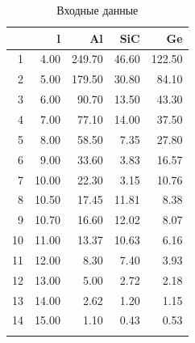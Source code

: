 \documentclass[a4paper,11pt]{report}\usepackage[]{graphicx}\usepackage[]{color}
\makeatletter
\newenvironment{kframe}{%
 \def\at@end@of@kframe{}%
 \ifinner\ifhmode%
  \def\at@end@of@kframe{\end{minipage}}%
  \begin{minipage}{\columnwidth}%
 \fi\fi%
 \def\FrameCommand##1{\hskip\@totalleftmargin \hskip-\fboxsep
 \colorbox{shadecolor}{##1}\hskip-\fboxsep
     \hskip-\linewidth \hskip-\@totalleftmargin \hskip\columnwidth}%
 \MakeFramed {\advance\hsize-\width
   \@totalleftmargin\z@ \linewidth\hsize
   \@setminipage}}%
 {\par\unskip\endMakeFramed%
 \at@end@of@kframe}
\makeatother
\begin{document}
\begin{kframe}


{\ttfamily\noindent\bfseries{}}\end{kframe}%
{\small
\begin{longtable}{|r|r|rrr|}
  \hline
 & l & Al & SiC & Ge \\ 
  \hline
1 & 4.00 & 249.70 & 46.60 & 122.50 \\ 
  2 & 5.00 & 179.50 & 30.80 & 84.10 \\ 
  3 & 6.00 & 90.70 & 13.50 & 43.30 \\ 
  4 & 7.00 & 77.10 & 14.00 & 37.50 \\ 
  5 & 8.00 & 58.50 & 7.35 & 27.80 \\ 
  6 & 9.00 & 33.60 & 3.83 & 16.57 \\ 
  7 & 10.00 & 22.30 & 3.15 & 10.76 \\ 
  8 & 10.50 & 17.45 & 11.81 & 8.38 \\ 
  9 & 10.70 & 16.60 & 12.02 & 8.07 \\ 
  10 & 11.00 & 13.37 & 10.63 & 6.16 \\ 
  11 & 12.00 & 8.30 & 7.40 & 3.93 \\ 
  12 & 13.00 & 5.00 & 2.72 & 2.18 \\ 
  13 & 14.00 & 2.62 & 1.20 & 1.15 \\ 
  14 & 15.00 & 1.10 & 0.43 & 0.53 \\ 
   \hline
\hline
\caption{Входные данные} 
\end{longtable}
}






\end{document}
